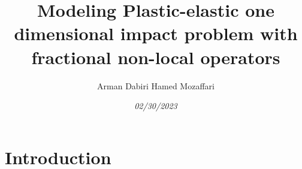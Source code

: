 \documentclass [a4paper,11pt]{article}
\begin{document}
\title{\textbf{Modeling Plastic-elastic one dimensional impact problem with fractional non-local operators}}
\author {Arman Dabiri Hamed Mozaffari}
\date{\itshape 02/30/2023}
\maketitle

\section{\textbf{Introduction}}
\end{document}
